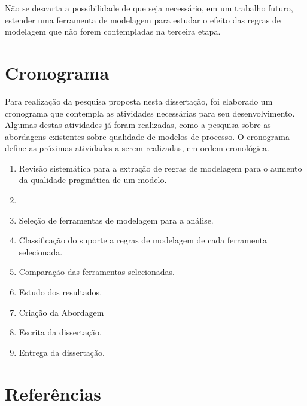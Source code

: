 \documentclass[12pt]{article}
\begin{document}
Não se descarta a possibilidade de que seja necessário, em um trabalho futuro, estender uma ferramenta de modelagem para estudar o efeito das regras de modelagem que não forem contempladas na terceira etapa.

\newpage
\section{Cronograma}

Para realização da pesquisa proposta nesta dissertação, foi elaborado um cronograma que contempla as atividades necessárias para seu desenvolvimento. Algumas destas atividades já foram realizadas, como a pesquisa sobre as abordagens existentes sobre qualidade de modelos de processo. O cronograma define as próximas atividades a serem realizadas, em ordem cronológica.

\begin{enumerate}
	\item Revisão sistemática para a extração de regras de modelagem para o aumento da qualidade pragmática de um modelo.
	\item 
	\item Seleção de ferramentas de modelagem para a análise.
	\item Classificação do suporte a regras de modelagem de cada ferramenta selecionada.
	\item Comparação das ferramentas selecionadas.
	\item Estudo dos resultados.
	\item Criação da Abordagem
	\item Escrita da dissertação.
	\item Entrega da dissertação.
\end{enumerate}

\newpage
\section{Referências}


\end{document}
